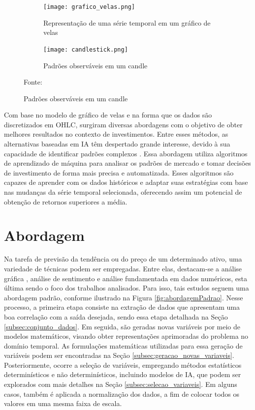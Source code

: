 \begin{figure}[htbp]
     \centering
     \caption{Gráfico de velas e suas características observáveis.}
     \begin{subfigure}[b]{0.48\textwidth}
         \centering
         \texttt{[image: grafico\_velas.png]}
         \caption{Representação de uma série temporal em um gráfico de velas}
         \label{fig:grafico_velas} 
     \end{subfigure}
     \hfill
     \begin{subfigure}[b]{0.48\textwidth}
         \centering
         \texttt{[image: candlestick.png]}
         \caption{Padrões observáveis em um candle}
         \label{fig:candle_definition}
     \end{subfigure}

     Fonte: 
\end{figure}
Com base no modelo de gráfico de velas e na forma que os dados são discretizados em \ac{OHLC}, surgiram diversas abordagens com o objetivo de obter melhores resultados no contexto de investimentos. Entre esses métodos, as alternativas baseadas em \ac{IA} têm despertado grande interesse, devido à sua capacidade de identificar padrões complexos \cite{dwivedi2021artificial}. Essa abordagem utiliza algoritmos de aprendizado de máquina para analisar os padrões de mercado e tomar decisões de investimento de forma mais precisa e automatizada. Esses algoritmos são capazes de aprender com os dados históricos e adaptar suas estratégias com base nas mudanças da série temporal selecionada, oferecendo assim um potencial de obtenção de retornos superiores a média.

\section{Abordagem}
\label{subsec:abordagem}
Na tarefa de previsão da tendência ou do preço de um determinado ativo, uma variedade de técnicas podem ser empregadas. Entre elas, destacam-se a análise gráfica \cite{matsura2017comprar}, análise de sentimento \cite{igarashi2021analise} e análise fundamentada em dados numéricos, esta última sendo o foco dos trabalhos analisados. Para isso, tais estudos seguem uma abordagem padrão, conforme ilustrado na Figura \ref{fig:abordagemPadrao}. Nesse processo, a primeira etapa consiste na extração de dados que apresentam uma boa correlação com a saída desejada, sendo essa etapa detalhada na Seção \ref{subsec:conjunto_dados}. Em seguida, são geradas novas variáveis por meio de modelos matemáticos, visando obter representações aprimoradas do problema no domínio temporal. As formulações matemáticas utilizadas para essa geração de variáveis podem ser encontradas na Seção \ref{subsec:geracao_novas_variaveis}. Posteriormente, ocorre a seleção de variáveis, empregando métodos estatísticos determinísticos e não determinísticos, incluindo modelos de \ac{IA}, que podem ser explorados com mais detalhes na Seção \ref{subsec:selecao_variaveis}. Em alguns casos, também é aplicada a normalização dos dados, a fim de colocar todos os valores em uma mesma faixa de escala.

